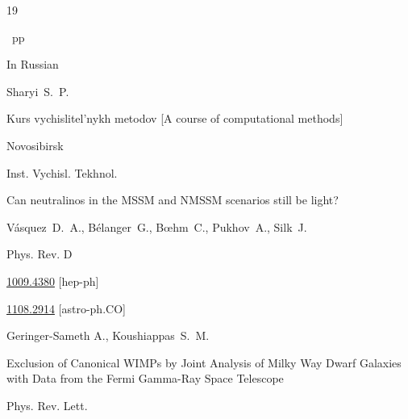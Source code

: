 \begin{thebibliography}{19}

~pp \nofrills





\lang In Russian

\by Sharyi~S.~P.

\book Kurs vychislitel'nykh metodov \rm [A course of computational methods]

\publaddr Novosibirsk

\publ Inst. Vychisl. Tekhnol. 










\paper Can neutralinos in the MSSM and NMSSM scenarios still be light?

\by V\'asquez~D.~A., B\'elanger~G., B{\oe}hm~C., Pukhov~A., Silk~J.

\jour Phys. Rev. D 





\arxiv \href{https://arxiv.org/abs/1009.4380}{1009.4380} [hep-ph]








\arxiv \href{https://arxiv.org/abs/1108.2914}{1108.2914} [astro-ph.CO]

\by Geringer-Sameth A., Koushiappas~S.~M.

\paper Exclusion of Canonical WIMPs by Joint Analysis of Milky Way Dwarf Galaxies with Data from the Fermi Gamma-Ray Space Telescope

\jour Phys. Rev. Lett.











\end{thebibliography}



\EngDate





%




